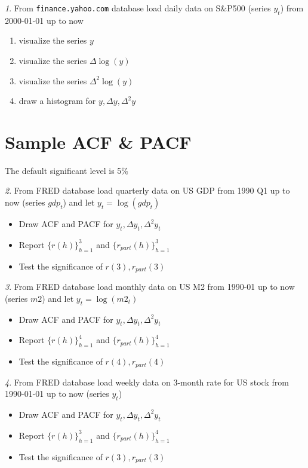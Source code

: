\documentclass[12pt]{article}
\theoremstyle{remark}
\newtheorem{exercise}{}[section]
\begin{document}
\begin{exercise}
From \texttt{finance.yahoo.com} database load daily data on S\&P500 (series \(y_t\))
from 2000-01-01 up to now
\begin{enumerate}
	\item visualize the series \(y\) 
	\item visualize the series \(\Delta\log(y)\)
	\item visualize the series \(\Delta^2\log(y)\)
	\item draw a histogram for \(y,\Delta y,\Delta^2 y\)
\end{enumerate}
\end{exercise}

\section{Sample ACF \& PACF}

The default significant level is 5\%

\begin{exercise}
From FRED database load quarterly data on US GDP from 1990 Q1 up to now (series \(gdp_t\))
and let \(y_t=\log(gdp_t)\)
\begin{itemize}
		\item Draw ACF and PACF for \(y_t, \Delta y_t, \Delta^2 y_t\)
		\item Report \(\{r(h)\}_{h=1}^3\) and \(\{r_{part}(h)\}_{h=1}^3\) 
		\item Test the significance of \(r(3),r_{part}(3)\)
\end{itemize}
\end{exercise}

\begin{exercise}
From FRED database load monthly data on US M2 from 1990-01 up to now (series \(m2\)) 
and let \(y_t=\log(m2_t)\)
\begin{itemize}
	\item Draw ACF and PACF for \(y_t, \Delta y_t, \Delta^2 y_t\)
	\item Report \(\{r(h)\}_{h=1}^4\) and \(\{r_{part}(h)\}_{h=1}^4\) 
	\item Test the significance of \(r(4),r_{part}(4)\)
\end{itemize}
\end{exercise}

\begin{exercise}
From FRED database load weekly data on 3-month rate  for US stock from 1990-01-01 up to now
(series \(y_t\))
\begin{itemize}
	\item Draw ACF and PACF for \(y_t, \Delta y_t, \Delta^2 y_t\)
	\item Report \(\{r(h)\}_{h=1}^3\) and \(\{r_{part}(h)\}_{h=1}^4\) 
	\item Test the significance of \(r(3),r_{part}(3)\)
\end{itemize}
\end{exercise}
\end{document}
